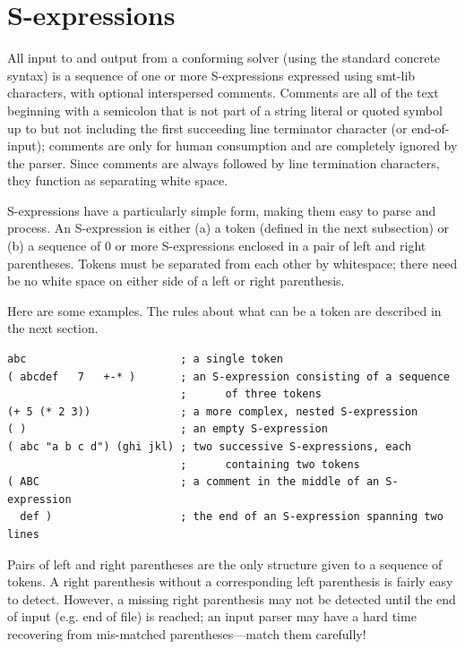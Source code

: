 \documentclass[12pt,oneside]{report}
\begin{document}
\section{S-expressions}

All input to and output from a conforming solver (using the standard concrete syntax) is a sequence of one or more S-expressions expressed using smt-lib characters, with optional interspersed comments.  Comments are all of the text beginning with a semicolon that is not part of a string literal or quoted symbol up to but not
including the first succeeding line terminator character (or end-of-input); comments are only for human consumption and are completely ignored by the parser. Since comments are always followed by line termination characters, they function as separating white space.

S-expressions have a particularly simple
form, making them easy to parse and process. An S-expression is either (a) a token (defined in the next subsection) or (b) a sequence of 0 or more S-expressions 
enclosed in a pair of left and right parentheses.  Tokens must be separated from each other by whitespace; there need be no white space on either side of a left or right parenthesis.

Here are some examples.  The rules about what can be a token are described in the next section.
\begin{verbatim}
abc                        ; a single token
( abcdef   7   +-* )       ; an S-expression consisting of a sequence 
                           ;      of three tokens
(+ 5 (* 2 3))              ; a more complex, nested S-expression
( )                        ; an empty S-expression
( abc "a b c d") (ghi jkl) ; two successive S-expressions, each
                           ;      containing two tokens
( ABC                      ; a comment in the middle of an S-expression
  def )                    ; the end of an S-expression spanning two lines
\end{verbatim}

Pairs of left and right parentheses are the only structure given to a sequence of tokens.  A right parenthesis without a 
corresponding left parenthesis is fairly easy to detect.  However, a missing right parenthesis may not be detected until the 
end of input (e.g. end of file) is reached; an input parser may have a hard time recovering from mis-matched parentheses---match them carefully! 
\end{document}
